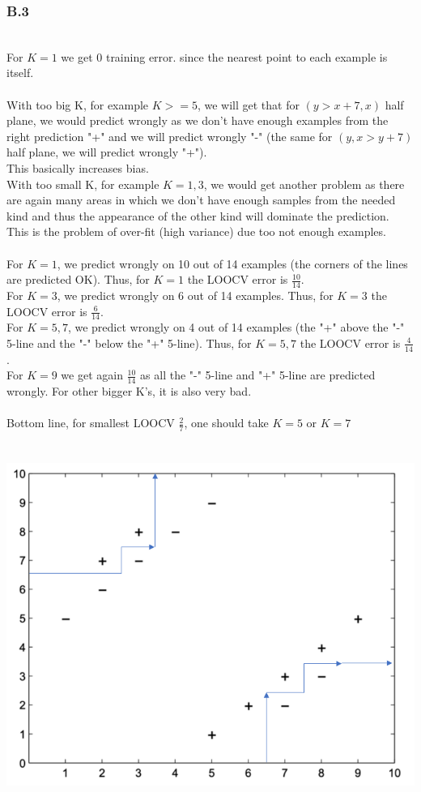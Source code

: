 \documentclass[12pt]{article}
\begin{document}
\subsubsection*{B.3}
\\
For $K=1$ we get 0 training error. since the nearest point to each example is itself.\\
\\
With too big K, for example $K>=5$, we will get that for $(y>x+7,x)$ half plane, we would predict wrongly as we don't have enough examples from the right prediction "+" and we will predict wrongly "-" (the same for $(y,x>y+7)$ half plane, we will predict wrongly "+").\\
This basically increases bias.\\
With too small K, for example $K=1,3$, we would get another problem as there are again many areas in which we don't have enough samples from the needed kind and thus the appearance of the other kind will dominate the prediction.\\
This is the problem of over-fit (high variance) due too not enough examples.\\
\\
For $K=1$, we predict wrongly on 10 out of 14 examples (the corners of the lines are predicted OK). Thus, for $K=1$ the LOOCV error is $\frac{10}{14}$.\\
For $K=3$, we predict wrongly on 6 out of 14 examples. Thus, for $K=3$ the LOOCV error is $\frac{6}{14}$.\\
For $K=5,7$, we predict wrongly on 4 out of 14 examples (the "+" above the "-" 5-line and the "-" below the "+" 5-line). Thus, for $K=5,7$ the LOOCV error is $\frac{4}{14}$.\\
For $K=9$ we get again $\frac{10}{14}$ as all the "-" 5-line and "+" 5-line are predicted wrongly. For other bigger K's, it is also very bad.\\
\\
Bottom line, for smallest LOOCV $\frac{2}{7}$, one should take $K=5$ or $K=7$\\
\\
\\
\includegraphics[scale=0.5]{hw3/plots/q3_answer.PNG}
\end{document}

